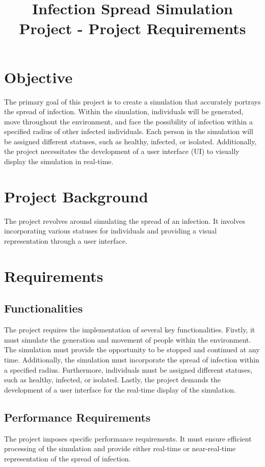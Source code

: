 \documentclass{article}
\begin{document}
	
	\title{Infection Spread Simulation Project - Project Requirements}
	\author{}
	\date{}
	\maketitle
	
	\tableofcontents
	\newpage
	
	\section{Objective}
	The primary goal of this project is to create a simulation that accurately portrays the spread of infection. Within the simulation, individuals will be generated, move throughout the environment, and face the possibility of infection within a specified radius of other infected individuals. Each person in the simulation will be assigned different statuses, such as healthy, infected, or isolated. Additionally, the project necessitates the development of a user interface (UI) to visually display the simulation in real-time.
	
	\section{Project Background}
	The project revolves around simulating the spread of an infection. It involves incorporating various statuses for individuals and providing a visual representation through a user interface.
	
	\section{Requirements}
	
	\subsection{Functionalities}
	The project requires the implementation of several key functionalities. Firstly, it must simulate the generation and movement of people within the environment. The simulation must provide the opportunity to be stopped and continued at any time. Additionally, the simulation must incorporate the spread of infection within a specified radius. Furthermore, individuals must be assigned different statuses, such as healthy, infected, or isolated. Lastly, the project demands the development of a user interface for the real-time display of the simulation.
	
	\subsection{Performance Requirements}
	The project imposes specific performance requirements. It must ensure efficient processing of the simulation and provide either real-time or near-real-time representation of the spread of infection.
	
\end{document}
